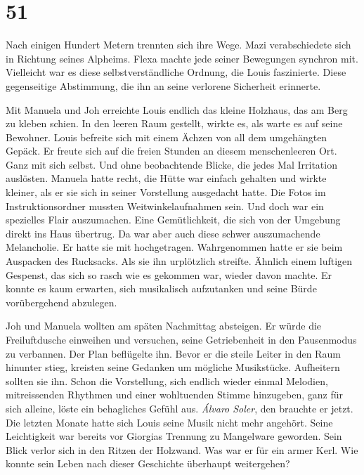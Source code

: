 \chapter{51}



Nach einigen Hundert Metern trennten sich ihre Wege. Mazi verabschiedete
sich in Richtung seines Alpheims. Flexa machte jede seiner Bewegungen
synchron mit. Vielleicht war es diese selbstverständliche Ordnung, die
Louis faszinierte. Diese gegenseitige Abstimmung, die ihn an seine
verlorene Sicherheit erinnerte.

Mit Manuela und Joh erreichte Louis endlich das kleine Holzhaus, das am
Berg zu kleben schien. In den leeren Raum gestellt, wirkte es, als warte
es  auf seine Bewohner.
Louis befreite sich mit einem Ächzen von all dem umgehängten Gepäck. Er
freute sich auf die freien Stunden an diesem menschenleeren Ort. Ganz
mit sich selbst. Und ohne beobachtende Blicke, die jedes Mal Irritation
auslösten.
Manuela hatte recht, die Hütte war einfach gehalten und wirkte kleiner,
als er sie sich in seiner Vorstellung ausgedacht hatte. Die Fotos im
Instruktionsordner mussten Weitwinkelaufnahmen sein. Und
doch war ein spezielles Flair auszumachen. Eine Gemütlichkeit, die sich
von der Umgebung direkt ins Haus übertrug. Da war aber auch diese schwer
auszumachende Melancholie. Er hatte sie mit hochgetragen.
Wahrgenommen hatte er sie beim Auspacken des Rucksacks. Als sie ihn
urplötzlich streifte. Ähnlich einem luftigen Gespenst, das sich so rasch wie es 
gekommen war, wieder davon machte. Er konnte es kaum erwarten, sich
musikalisch aufzutanken und seine Bürde vorübergehend abzulegen.

Joh und Manuela wollten am späten Nachmittag absteigen. Er würde die
Freiluftdusche einweihen und versuchen, seine Getriebenheit in den
Pausenmodus zu verbannen. Der Plan beflügelte ihn.
Bevor er die steile Leiter in den Raum hinunter stieg, kreisten seine
Gedanken um mögliche Musikstücke. Aufheitern sollten sie ihn. Schon die
Vorstellung, sich endlich wieder einmal Melodien, mitreissenden Rhythmen
und einer wohltuenden Stimme hinzugeben, ganz für sich alleine, löste ein
behagliches Gefühl aus. \emph{Álvaro Soler}, den brauchte er jetzt.
Die letzten Monate hatte sich Louis seine Musik nicht mehr angehört.
Seine Leichtigkeit war bereits vor Giorgias Trennung zu Mangelware
geworden.
Sein Blick verlor sich in den Ritzen der Holzwand. Was war er für ein
armer Kerl. Wie konnte sein Leben nach dieser Geschichte überhaupt
weitergehen?

